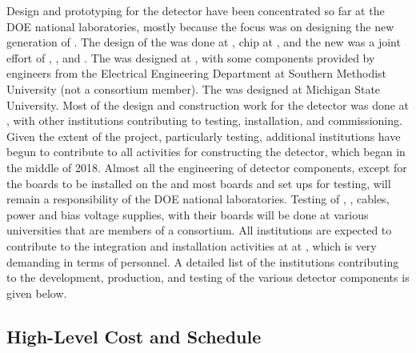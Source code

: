 Design and prototyping for the   detector have been 
concentrated so far at the DOE national laboratories, mostly because the 
focus was on designing the new generation of . The design 
of the   was done at ,  
chip at , and the new  was a joint effort of 
, , and . The  
 was designed at , with some components 
provided by engineers from the Electrical Engineering Department
at Southern Methodist University (not a consortium member).
The  was designed at Michigan State University.
Most of the design and construction work for the  detector 
was done at , with other institutions contributing to 
testing, installation, and commissioning. Given the extent of the project, 
particularly testing, additional institutions have begun to contribute
to all activities for constructing the  detector, which began 
in the middle of 2018. Almost all the engineering of detector components, 
except for the boards to be installed on the  and most boards 
and set ups for testing, will remain a responsibility
of the DOE national laboratories. Testing of 
, , cables, power and bias voltage supplies,
 with their boards will be done at various
universities that are members of a consortium. All institutions
are expected to contribute to the integration and installation activities at
at , which is very
demanding in terms of personnel. A detailed list of the 
institutions contributing to the development, production, and
testing of the various detector components is given below.

\subsection{High-Level Cost and Schedule}
\label{sec:fdsp-tpcelec-management-cost}


